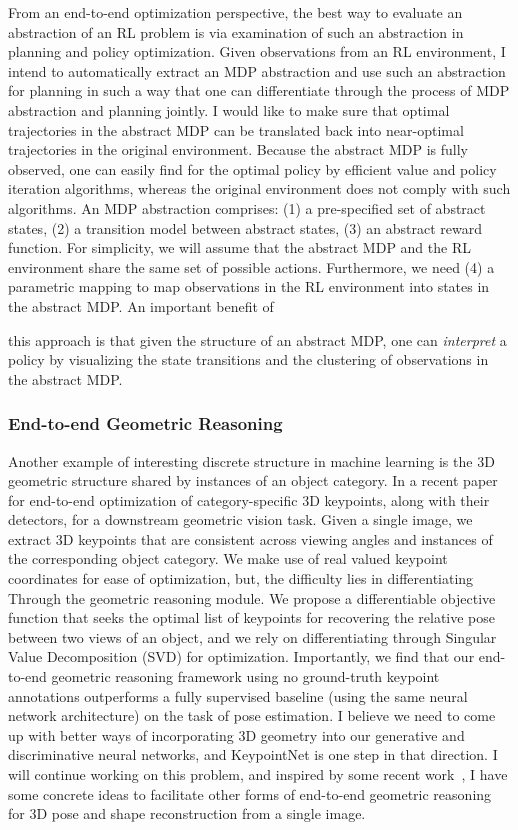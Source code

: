 \documentclass[a4paper, 10pt]{article}
\begin{document}
From an end-to-end optimization perspective, the best way to evaluate
an abstraction of an RL problem is via examination of such an
abstraction in planning and policy optimization. Given observations
from an RL environment, I intend to automatically extract an MDP
abstraction and use such an abstraction for planning in such a way
that one can differentiate through the process of MDP abstraction and
planning jointly. I would like to make sure that optimal trajectories
in the abstract MDP can be translated back into near-optimal
trajectories in the original environment. Because the abstract MDP is
fully observed, one can easily find for the optimal policy by
efficient value and policy iteration algorithms, whereas the original
environment does not comply with such algorithms. An MDP abstraction
comprises: (1) a pre-specified set of abstract states, (2) a
transition model between abstract states, (3) an abstract reward
function. For simplicity, we will assume that the abstract MDP and the
RL environment share the same set of possible actions. Furthermore, we
need (4) a parametric mapping to map observations in the RL
environment into states in the abstract MDP. An important benefit of


this approach is that given the structure of an abstract MDP, one can
{\em interpret} a policy by visualizing the state transitions and the
clustering of observations in the abstract MDP.

\vspace*{-.2cm}
\subsubsection*{End-to-end Geometric Reasoning}

\hspace{\parindent} Another example of interesting discrete structure
in machine learning is the 3D geometric structure shared by instances
of an object category. In a recent paper~\cite{keypointnet} for
end-to-end optimization of category-specific 3D keypoints, along with
their detectors, for a downstream geometric vision task. Given a
single image, we extract 3D keypoints that are consistent across
viewing angles and instances of the corresponding object category. We
make use of real valued keypoint coordinates for ease of optimization,
but, the difficulty lies in differentiating Through the geometric
reasoning module. We propose a differentiable objective function that
seeks the optimal list of keypoints for recovering the relative pose
between two views of an object, and we rely on differentiating through
Singular Value Decomposition (SVD) for optimization.  Importantly, we
find that our end-to-end geometric reasoning framework using no
ground-truth keypoint annotations outperforms a fully supervised
baseline (using the same neural network architecture) on the task of
pose estimation. I believe we need to come up with better ways of
incorporating 3D geometry into our generative and discriminative
neural networks, and KeypointNet is one step in that direction. I will
continue working on this problem, and inspired by some recent
work~\cite{kanazawa}, I have some concrete ideas to facilitate other
forms of end-to-end geometric reasoning for 3D pose and shape
reconstruction from a single image.
\end{document}
